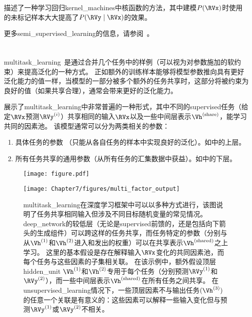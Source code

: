 \cite{Russ+Geoff-nips-2007}描述了一种学习回归\gls{kernel_machines}中核函数的方法，其中建模$P(\RVx)$时使用的未标记样本大大提高了$P(\RVy \mid \RVx)$的效果。

更多\gls{semi_supervised_learning}的信息，请参阅~\cite{Chapelle-2006}。

\section{}
\label{sec:multitask_learning}
\gls{multitask_learning}~\citep{caruana93a}是通过合并几个任务中的样例（可以视为对参数施加的软约束）来提高泛化的一种方式。
正如额外的训练样本能够将模型参数推向具有更好泛化能力的值一样，当模型的一部分被多个额外的任务共享时，这部分将被约束为良好的值（如果共享合理），通常会带来更好的泛化能力。

展示了\gls{multitask_learning}中非常普遍的一种形式，其中不同的\gls{supervised}任务（给定$\RVx$预测$\RVy^{(i)}$）共享相同的输入$\RVx$以及一些中间层表示$\Vh^{(\text{share})}$，能学习共同的因素池。
该模型通常可以分为两类相关的参数：
\begin{enumerate}
 \item 具体任务的参数 （只能从各自任务的样本中实现良好的泛化）。如中的上层。
 \item 所有任务共享的通用参数（从所有任务的汇集数据中获益）。如中的下层。
\end{enumerate}
\begin{figure}[!htb]
\ifOpenSource
\centerline{\texttt{[image: figure.pdf]}}
\else
\centerline{\texttt{[image: Chapter7/figures/multi\_factor\_output]}}
\fi
\caption{\gls{multitask_learning}在深度学习框架中可以以多种方式进行，该图说明了任务共享相同输入但涉及不同目标随机变量的常见情况。
\gls{deep_network}的较低层（无论是\gls{supervised}前馈的，还是包括向下箭头的生成组件）可以跨这样的任务共享，而任务特定的参数（分别与从$\Vh^{(1)}$和$\Vh^{(2)}$进入和发出的权重）可以在共享表示$\Vh^{(\text{shared})}$之上学习。
这里的基本假设是存在解释输入$\RVx$变化的共同因素池，而每个任务与这些因素的子集相关联。
在该示例中，额外假设顶层\gls{hidden_unit} $\Vh^{(1)}$和$\Vh^{(2)}$专用于每个任务（分别预测$\RVy^{(1)}$和$\RVy^{(2)}$），而一些中间层表示$\Vh^{(\text{shared})}$在所有任务之间共享。
在\gls{unsupervised_learning}情况下，一些顶层因素不与输出任务$(\Vh^{(3)})$的任意一个关联是有意义的：这些因素可以解释一些输入变化但与预测$\RVy^{(1)}$或$\RVy^{(2)}$不相关。
}
\label{fig:chap7_multi_factor_output}
\end{figure}


